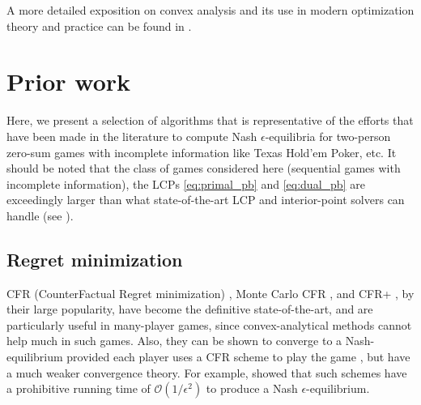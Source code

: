 \documentclass{article}
\begin{document}
A more detailed exposition on convex analysis and its use in
modern optimization theory and practice can be found in
\cite{rockafellar1997convex,combettes2011proximal}.

\section{Prior work}
\label{sec:related_work}
Here, we present a selection of algorithms that is representative of the
efforts that have been made in the literature to compute Nash
$\epsilon$-equilibria for two-person zero-sum games with incomplete
information like Texas Hold'em Poker, etc.
It should be noted that the class of games considered
here (sequential games with incomplete information), the LCPs
\eqref{eq:primal_pb} and \eqref{eq:dual_pb} are exceedingly larger
than what state-of-the-art LCP and interior-point solvers can
handle (see \cite{hoda2010smoothing,gilpinfirst}).

\subsection{Regret minimization}
CFR (CounterFactual Regret minimization) \cite{zinkevich2008regret},
Monte Carlo CFR \cite{lanctot2009monte}, and CFR+
\cite{Bowling09012015}, by their large popularity, have become the
definitive state-of-the-art, and are particularly useful in
many-player games, since convex-analytical methods cannot help much in
such games. Also, they can be shown to converge to a Nash-equilibrium
provided each player uses a CFR scheme to play the game
\cite{zinkevich2008regret}, but have a much weaker
convergence theory. For example, \cite{lanctot2009monte} showed that
such schemes have a prohibitive running time of
$\mathcal{O}(1/\epsilon^2)$ to produce a Nash $\epsilon$-equilibrium.
\end{document}
